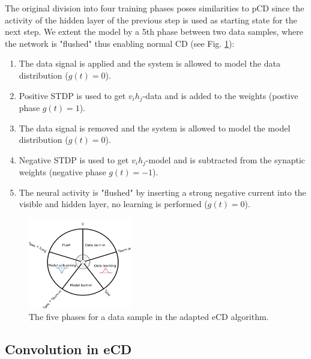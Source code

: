 The original division into four training phases poses similarities to pCD since the activity of the hidden layer of the previous step is used as starting state for the next step.
We extent the model by a 5th phase between two data samples, where the network is "flushed" thus enabling normal CD  (see Fig. \ref{fig:ecd5}):

\begin{enumerate}
\item The data signal is applied and the system is allowed to model the data distribution ($g(t)=0$).
\item Positive STDP is used to get $v_i h_j$-data and is added to the weights (postive phase $g(t)=1$).
\item The data signal is removed and the system is allowed to model the model distribution ($g(t)=0$).
\item Negative STDP is used to get $v_i h_j$-model and is subtracted from the synaptic weights (negative phase $g(t)=-1$).
\item The neural activity is "flushed" by inserting a strong negative current into the visible and hidden layer, no learning is performed ($g(t)=0$).
\end{enumerate}

\begin{figure}
	\centering
   	\includegraphics[width=0.4\textwidth]{imgs/eCD_5phases.png} 
    \caption{The five phases for a data sample in the adapted eCD algorithm. }
	\label{fig:ecd5}
\end{figure}

 
\subsection{Convolution in eCD} \label{c:ecdconv}

